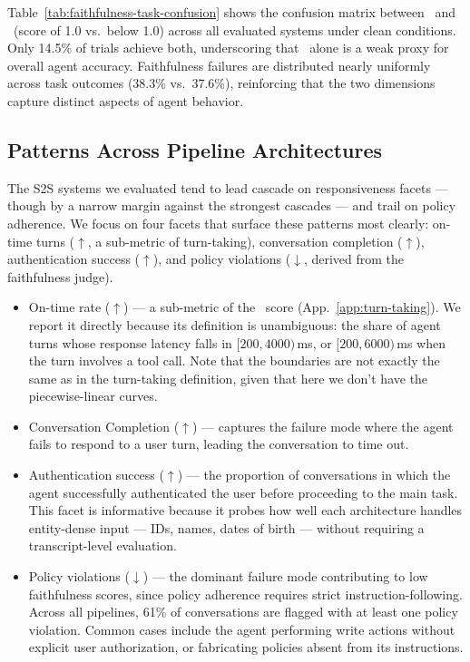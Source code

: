 Table~\ref{tab:faithfulness-task-confusion} shows the confusion matrix between \metrictaskcompletion~and \metricfaithfulness~(score of 1.0 vs.\ below 1.0) across all evaluated systems under clean conditions. Only 14.5\% of trials achieve both, underscoring that \metrictaskcompletion~alone is a weak proxy for overall agent accuracy. Faithfulness failures are distributed nearly uniformly across task outcomes (38.3\% vs.\ 37.6\%), reinforcing that the two dimensions capture distinct aspects of agent behavior.

\subsection{Patterns Across Pipeline Architectures}
\label{app:pipeline-comparison}

The S2S systems we evaluated tend to lead cascade on responsiveness facets — though by a narrow margin against the strongest cascades — and trail on policy adherence. We focus on four facets that surface these patterns most clearly: on-time turns ($\uparrow$, a sub-metric of turn-taking), conversation completion ($\uparrow$), authentication success ($\uparrow$), and policy violations ($\downarrow$, derived from the faithfulness judge).
\begin{itemize}
\item On-time rate ($\uparrow$) --- a sub-metric of the \metricturntaking~score (App.~\ref{app:turn-taking}). We report it directly because its definition is unambiguous: the share of agent turns whose response latency falls in $[200, 4000)$\,ms, or $[200, 6000)$\,ms when the turn involves a tool call. Note that the boundaries are not exactly the same as in the turn-taking definition, given that here we don't have the piecewise-linear curves.
\item Conversation Completion ($\uparrow$) --- captures the failure mode where the agent fails to respond to a user turn, leading the conversation to time out.
\item Authentication success ($\uparrow$) --- the proportion of conversations in which the agent successfully authenticated the user before proceeding to the main task. This facet is informative because it probes how well each architecture handles entity-dense input — IDs, names, dates of birth — without requiring a transcript-level evaluation.
\item Policy violations ($\downarrow$) --- the dominant failure mode contributing to low faithfulness scores, since policy adherence requires strict instruction-following. Across all pipelines, 61\% of conversations are flagged with at least one policy violation. Common cases include the agent performing write actions without explicit user authorization, or fabricating policies absent from its instructions.
\end{itemize}


